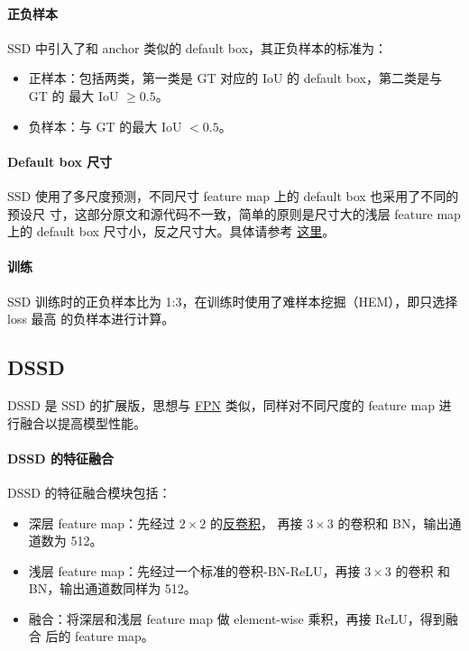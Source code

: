 \paragraph{正负样本}
SSD 中引入了和 anchor 类似的 default box，其正负样本的标准为：

\begin{itemize}
\item 正样本：包括两类，第一类是 GT 对应的 IoU 的 default box，第二类是与 GT 的
  最大 IoU $ \geq 0.5 $。
\item 负样本：与 GT 的最大 IoU $ < 0.5 $。
\end{itemize}

\paragraph{Default box 尺寸}
SSD 使用了多尺度预测，不同尺寸 feature map 上的 default box 也采用了不同的预设尺
寸，这部分原文和源代码不一致，简单的原则是尺寸大的浅层 feature map 上的 default
box 尺寸小，反之尺寸大。具体请参考
\href{https://github.com/weiliu89/caffe/blob/ssd/examples/ssd/ssd_pascal.py}{这里}。

\paragraph{训练}
SSD 训练时的正负样本比为 1:3，在训练时使用了难样本挖掘（HEM），即只选择 loss 最高
的负样本进行计算。

\subsection{DSSD}
\label{subsec:DSSD}

DSSD 是 SSD 的扩展版，思想与 \hyperref[sec:FPN]{FPN} 类似，同样对不同尺度的
feature map 进行融合以提高模型性能。

\paragraph{DSSD 的特征融合}
DSSD 的特征融合模块包括：

\begin{itemize}
  \item 深层 feature map：先经过 $2 \times 2$ 的\hyperref[subsec:deconv]{反卷积}，
    再接 $3 \times 3$ 的卷积和 BN，输出通道数为 512。
  \item 浅层 feature map：先经过一个标准的卷积-BN-ReLU，再接 $3 \times 3$ 的卷积
    和 BN，输出通道数同样为 512。
  \item 融合：将深层和浅层 feature map 做 element-wise 乘积，再接 ReLU，得到融合
    后的 feature map。
\end{itemize}

